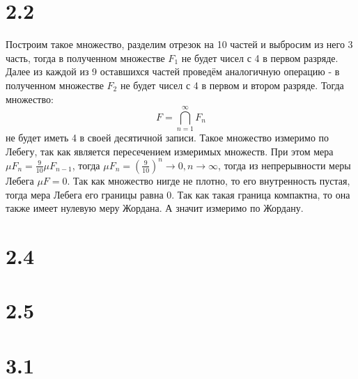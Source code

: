 \documentclass[12pt]{article}
\begin{document}
\section{2.2}
Построим такое множество, разделим отрезок на 10 частей и выбросим из него 3 часть, тогда в полученном 
множестве $F_1$ не будет чисел с 4 в первом разряде. Далее из каждой из 9 оставшихся частей проведём аналогичную операцию - 
в полученном множестве $F_2$ не будет чисел с 4 в первом и втором разряде. Тогда множество:
\[
    F = \bigcap_{n=1}^{\infty} F_n
\]  
не будет иметь 4 в своей десятичной записи. Такое множество измеримо по Лебегу, так как является 
пересечением измеримых множеств. При этом мера $\mu F_n = \frac{9}{10} \mu F_{n-1}$, тогда 
$\mu F_n = \left( \frac{9}{10} \right)^n \to 0, n \to \infty$, тогда из непрерывности меры Лебега 
$\mu F = 0$. Так как множество нигде не плотно, то его внутренность пустая, тогда мера Лебега его 
границы равна $0$. Так как такая граница компактна, то она также имеет нулевую меру Жордана. А значит измеримо по 
Жордану. 

\section{2.4}

\section{2.5}

\section{3.1}   
\end{document}
